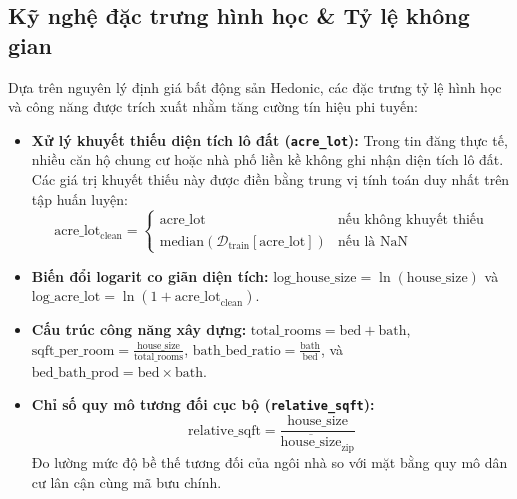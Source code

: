 \documentclass[12pt,a4paper]{report}
\begin{document}
\subsection{Kỹ nghệ đặc trưng hình học \& Tỷ lệ không gian}
Dựa trên nguyên lý định giá bất động sản Hedonic, các đặc trưng tỷ lệ hình học và công năng được trích xuất nhằm tăng cường tín hiệu phi tuyến:
\begin{itemize}
    \item \textbf{Xử lý khuyết thiếu diện tích lô đất (\texttt{acre\_lot}):} Trong tin đăng thực tế, nhiều căn hộ chung cư hoặc nhà phố liền kề không ghi nhận diện tích lô đất. Các giá trị khuyết thiếu này được điền bằng trung vị tính toán duy nhất trên tập huấn luyện:
    \begin{equation}
        \text{acre\_lot}_{\text{clean}} = \begin{cases} \text{acre\_lot} & \text{nếu không khuyết thiếu} \\ \text{median}(\mathcal{D}_{\text{train}}[\text{acre\_lot}]) & \text{nếu là NaN} \end{cases}
    \end{equation}
    \item \textbf{Biến đổi logarit co giãn diện tích:} $\text{log\_house\_size} = \ln(\text{house\_size})$ và $\text{log\_acre\_lot} = \ln(1 + \text{acre\_lot}_{\text{clean}})$.
    \item \textbf{Cấu trúc công năng xây dựng:} $\text{total\_rooms} = \text{bed} + \text{bath}$, $\text{sqft\_per\_room} = \frac{\text{house\_size}}{\text{total\_rooms}}$, $\text{bath\_bed\_ratio} = \frac{\text{bath}}{\text{bed}}$, và $\text{bed\_bath\_prod} = \text{bed} \times \text{bath}$.
    \item \textbf{Chỉ số quy mô tương đối cục bộ (\texttt{relative\_sqft}):}
    \begin{equation}
        \text{relative\_sqft} = \frac{\text{house\_size}}{\overline{\text{house\_size}}_{\text{zip}}}
    \end{equation}
    Đo lường mức độ bề thế tương đối của ngôi nhà so với mặt bằng quy mô dân cư lân cận cùng mã bưu chính.
\end{itemize}
\end{document}
